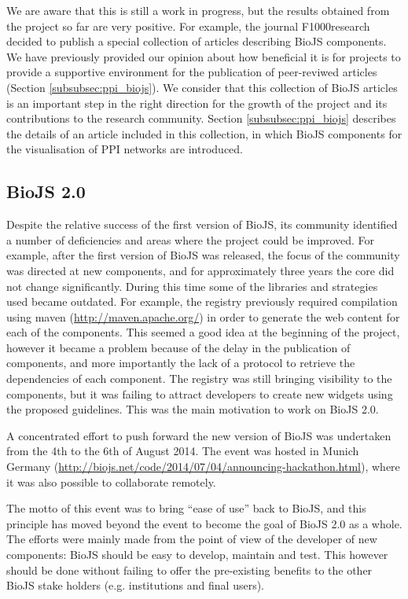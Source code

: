 We are aware that this is still a work in progress, but the results obtained from the project so far are very positive. For example, the journal F1000research decided to publish a special collection of articles describing BioJS components. We have previously provided our opinion about how beneficial it is for projects to provide a supportive environment for the publication of peer-reviwed articles (Section \ref{subsubsec:ppi_biojs}). We consider that this collection of BioJS articles is an important step in the right direction for the growth of the project and its contributions to the research community. Section \ref{subsubsec:ppi_biojs} describes the details of an article included in this collection, in which BioJS components for the visualisation of PPI networks are introduced.

\subsection{BioJS 2.0}
Despite the relative success of the first version of BioJS, its community identified a number of deficiencies and areas where the project could be improved. For example, after the first version of BioJS was released, the focus of the community was directed at new components, and for approximately three years the core did not change significantly. During this time some of the libraries and strategies used became outdated. For example, the registry previously required compilation using maven (\url{http://maven.apache.org/}) in order to generate the web content for each of the components. This seemed a good idea at the beginning of the project, however it became a problem because of the delay in the publication of components, and more importantly the lack of a protocol to retrieve the dependencies of each component. The registry was still bringing visibility to the components, but it was failing to attract developers to create new widgets using the proposed guidelines. This was the main motivation to work on BioJS 2.0.

A concentrated effort to push forward the new version of BioJS was undertaken from the 4th to the 6th of August 2014. The event was hosted in Munich Germany (\url{http://biojs.net/code/2014/07/04/announcing-hackathon.html}), where it was also possible to collaborate remotely. 

The motto of this event was to bring ``ease of use'' back to BioJS, and this principle has moved beyond the event to become the goal of BioJS 2.0 as a whole.  The efforts were mainly made from the point of view of the developer of new components: BioJS should be easy to develop, maintain and test. This however should be done without failing to offer the pre-existing benefits to the other BioJS stake holders (e.g. institutions and final users).

